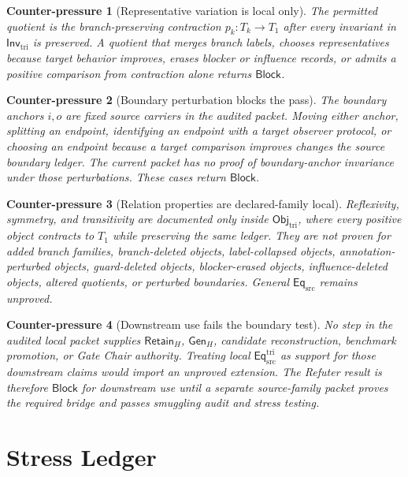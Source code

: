 \documentclass[11pt]{article}
\newcommand{\EqSrc}{\mathsf{Eq}_{\mathrm{src}}}
\newcommand{\EqTri}{\mathsf{Eq}_{\mathrm{src}}^{\mathrm{tri}}}
\newcommand{\ObjTri}{\mathsf{Obj}_{\mathrm{tri}}}
\newcommand{\InvTri}{\mathsf{Inv}_{\mathrm{tri}}}
\newcommand{\RetainH}{\mathsf{Retain}_{H}}
\newcommand{\GenH}{\mathsf{Gen}_{H}}
\newcommand{\Block}{\mathsf{Block}}
\newtheorem{counterpressure}{Counter-pressure}
\begin{document}
\begin{counterpressure}[Representative variation is local only]
The permitted quotient is the branch-preserving contraction
\(p_{k}:T_{k}\to T_{1}\) after every invariant in \(\InvTri\) is
preserved. A quotient that merges branch labels, chooses
representatives because target behavior improves, erases blocker or
influence records, or admits a positive comparison from contraction
alone returns \(\Block\).
\end{counterpressure}

\begin{counterpressure}[Boundary perturbation blocks the pass]
The boundary anchors \(i,o\) are fixed source carriers in the audited
packet. Moving either anchor, splitting an endpoint, identifying an
endpoint with a target observer protocol, or choosing an endpoint
because a target comparison improves changes the source boundary
ledger. The current packet has no proof of boundary-anchor invariance
under those perturbations. These cases return \(\Block\).
\end{counterpressure}

\begin{counterpressure}[Relation properties are declared-family local]
Reflexivity, symmetry, and transitivity are documented only inside
\(\ObjTri\), where every positive object contracts to \(T_{1}\) while
preserving the same ledger. They are not proven for added branch
families, branch-deleted objects, label-collapsed objects,
annotation-perturbed objects, guard-deleted objects,
blocker-erased objects, influence-deleted objects, altered quotients, or
perturbed boundaries. General \(\EqSrc\) remains unproved.
\end{counterpressure}

\begin{counterpressure}[Downstream use fails the boundary test]
No step in the audited local packet supplies \(\RetainH\), \(\GenH\),
candidate reconstruction, benchmark promotion, or Gate Chair authority.
Treating local \(\EqTri\) as support for those downstream claims would
import an unproved extension. The Refuter result is therefore
\(\Block\) for downstream use until a separate source-family packet
proves the required bridge and passes smuggling audit and stress
testing.
\end{counterpressure}

\section{Stress Ledger}
\end{document}
